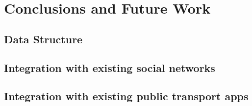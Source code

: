 \chapter{Conclusions and Future Work} \label{chap:chap7}

\section{Data Structure}

\section{Integration with existing social networks}

\section{Integration with existing public transport apps}



